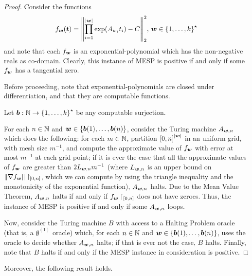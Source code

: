 \begin{proof}
Consider the functions
\begin{equation*}
    f_{\boldsymbol{w}}(\boldsymbol{t}) = {\left \| \prod \limits_{i=1}^{\lvert \boldsymbol{w} \rvert} \exp(A_{w_{i}} t_{i}) - C \right \|}_{2}^{2}, \, \boldsymbol{w} \in {\lbrace 1, \ldots, k \rbrace}^{\star}
\end{equation*}
and note that each $f_{\boldsymbol{w}}$ is an exponential-polynomial which has the non-negative reals as co-domain. Clearly, this instance of MESP is positive if and only if some $f_{\boldsymbol{w}}$ has a tangential zero.

Before proceeding, note that exponential-polynomials are closed under differentiation, and that they are computable functions.

Let $\boldsymbol{b} : \mathbb{N} \rightarrow {\lbrace 1, \ldots, k \rbrace}^{\star}$ be any computable surjection.

For each $n \in \mathbb{N}$ and $\boldsymbol{w} \in \lbrace \boldsymbol{b}(1), \ldots, \boldsymbol{b}(n) \rbrace$, consider the Turing machine $A_{\boldsymbol{w}, n}$ which does the following:
for each $m \in \mathbb{N}$, partition ${[0,n]}^{\lvert \boldsymbol{w} \rvert}$ in an uniform grid, with mesh size $m^{-1}$, and compute the approximate value of $f_{\boldsymbol{w}}$ with error at most $m^{-1}$ at each grid point;
if it is ever the case that all the approximate values of $f_{\boldsymbol{w}}$ are greater than $2 L_{\boldsymbol{w}, n} m^{-1}$ (where $L_{\boldsymbol{w}, n}$ is an upper bound on ${\| \nabla f_{\boldsymbol{w}} \|}\restriction_{[0,n]}$, which we can compute by using the triangle inequality and the monotonicity of the exponential function), $A_{\boldsymbol{w}, n}$ halts. Due to the Mean Value Theorem, $A_{\boldsymbol{w}, n}$ halts if and only if $f_{\boldsymbol{w}} \restriction_{[0,n]}$ does not have zeroes.
Thus, the instance of MESP is positive if and only if some $A_{\boldsymbol{w}, n}$ loops.

Now, consider the Turing machine $B$ with access to a Halting Problem oracle (that is, a $\emptyset^{(1)}$ oracle) which, for each $n \in \mathbb{N}$ and $\boldsymbol{w} \in \lbrace \boldsymbol{b}(1), \ldots, \boldsymbol{b}(n) \rbrace$, uses the oracle to decide whether $A_{\boldsymbol{w}, n}$ halts; if that is ever not the case, $B$ halts. Finally, note that $B$ halts if and only if the MESP instance in consideration is positive.
\end{proof}

Moreover, the following result holds.

